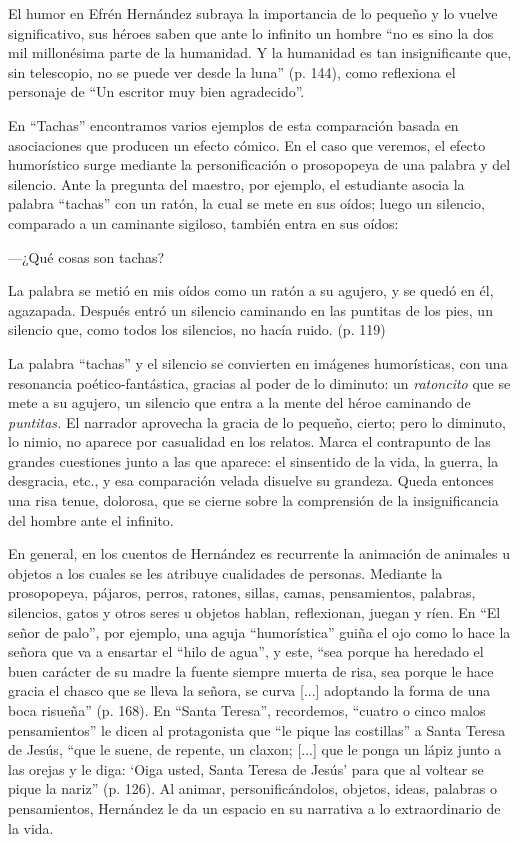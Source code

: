 \documentclass[14pt,twoside,final]{extbook} %
\begin{document}
El humor en Efrén Hernández subraya la importancia de lo pequeño y lo vuelve significativo, sus héroes saben que ante lo infinito un hombre ``no es sino la dos mil millonésima parte de la humanidad. Y la humanidad es tan insignificante que, sin telescopio, no se puede ver desde la luna'' (p. 144), como reflexiona el personaje de ``Un escritor muy bien agradecido''.

En ``Tachas'' encontramos varios ejemplos de esta comparación basada en asociaciones que producen un efecto cómico. En el caso que veremos, el efecto humorístico surge mediante la personificación o prosopopeya de una palabra y del silencio. Ante la pregunta del maestro, por ejemplo, el estudiante asocia la palabra ``tachas'' con un ratón, la cual se mete en sus oídos; luego un silencio, comparado a un caminante sigiloso, también entra en sus oídos:
\begin{quoting}
---¿Qué cosas son tachas?

La palabra se metió en mis oídos como un ratón a su agujero, y se quedó en él, agazapada. Después entró un silencio caminando en las puntitas de los pies, un silencio que, como todos los silencios, no hacía ruido. (p. 119)
\end{quoting}
La palabra ``tachas'' y el silencio se convierten en imágenes humorísticas, con una resonancia poético-fantástica, gracias al poder de lo diminuto: un \emph{ratoncito} que se mete a su agujero, un silencio que entra a la mente del héroe caminando de \emph{puntitas.} El narrador aprovecha la gracia de lo pequeño, cierto; pero lo diminuto, lo nimio, no aparece por casualidad en los relatos. Marca el contrapunto de las grandes cuestiones junto a las que aparece: el sinsentido de la vida, la guerra, la desgracia, etc., y esa comparación velada disuelve su grandeza. Queda entonces una risa tenue, dolorosa, que se cierne sobre la comprensión de la insignificancia del hombre ante el infinito.

En general, en los cuentos de Hernández es recurrente la animación de animales u objetos a los cuales se les atribuye cualidades de personas. Mediante la prosopopeya, pájaros, perros, ratones, sillas, camas, pensamientos, palabras, silencios, gatos y otros seres u objetos hablan, reflexionan, juegan y ríen. En ``El señor de palo'', por ejemplo, una aguja ``humorística'' guiña el ojo como lo hace la señora que va a ensartar el ``hilo de agua'', y este, ``sea porque ha heredado el buen carácter de su madre la fuente siempre muerta de risa, sea porque le hace gracia el chasco que se lleva la señora, se curva [...] adoptando la forma de una boca risueña'' (p. 168). En ``Santa Teresa'', recordemos, ``cuatro o cinco malos pensamientos'' le dicen al protagonista que ``le pique las costillas'' a Santa Teresa de Jesús, ``que le suene, de repente, un claxon; [...] que le ponga un lápiz junto a las orejas y le diga: `Oiga usted, Santa Teresa de Jesús' para que al voltear se pique la nariz'' (p. 126). Al animar, personificándolos, objetos, ideas, palabras o pensamientos, Hernández le da un espacio en su narrativa a lo extraordinario de la vida.
\end{document}
